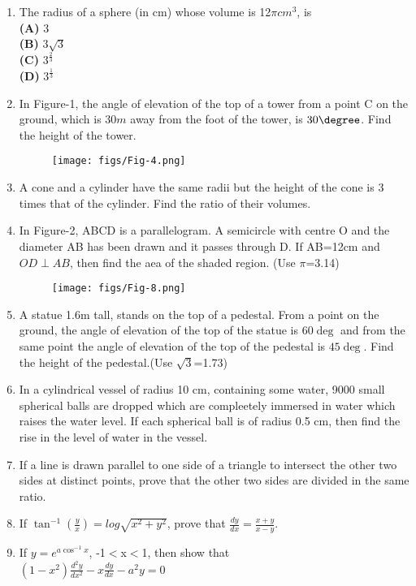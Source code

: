 \begin{enumerate}
\item The radius of a sphere (in cm) whose volume is 12$\pi cm^3$, is\\
\textbf{(A)} $3$\\
\textbf{(B)} $3 \sqrt{3}$\\
\textbf{(C)} $3^\frac{2}{3}$\\
\textbf{(D)} $3^\frac{1}{3}$\\
\item In Figure-1, the angle of elevation of the top of a tower from a point C on the ground, which is $30m$ away from the foot of the tower, is $30\degree$. Find the height of the tower.                                                                                                
	\begin{figure}[H]
	\centering                
  	\texttt{[image: figs/Fig-4.png]}                                                                                 	
   	\caption{}                                                                         
  	\label{}
	\end{figure}
\item A cone and a cylinder have the same radii but the height of the cone is 3 times that of the cylinder. Find the ratio of their volumes.\\
\item In Figure-2, ABCD is a parallelogram. A semicircle with centre O and the diameter AB has been drawn and it passes through D. If AB=12cm and $OD \perp AB$, then find the aea of the shaded region. (Use $\pi$=3.14)\\
          \begin{figure}[H]
                  \centering
                  \texttt{[image: figs/Fig-8.png]}
                 \caption{}
                 \label{}
          \end{figure}
\item A statue 1.6m tall, stands on the top of a pedestal. From a point on the ground, the angle of elevation of the top of the statue is $60\deg$ and from the same point the angle of elevation of the top of the pedestal is $45\deg$. Find the height of the pedestal.(Use $\sqrt{
    3}$=1.73)
\item In a cylindrical vessel of radius 10 cm, containing some water, 9000 small spherical balls are dropped which are compleetely immersed in water which raises the water level. If each spherical ball is of radius 0.5 cm, then find the rise in the level of water in the vessel.
\item If a line is drawn parallel to one side of a triangle to intersect the other two sides at distinct points, prove that the other two sides are divided in the same ratio.
\item If $\tan^{-1}\left(\frac{y}{x}\right)=log\sqrt{x^2+y^2}$, prove that $\frac{dy}{dx}=\frac{x+y}{x-y}$.
\item If $y=e^{a \cos^{-1}x}$, -1$<$x$<$1, then show that\\
         $(1-x^2)\frac{d^2y}{dx^2}-x\frac{dy}{dx}-a^2y=0$		
\end{enumerate}
